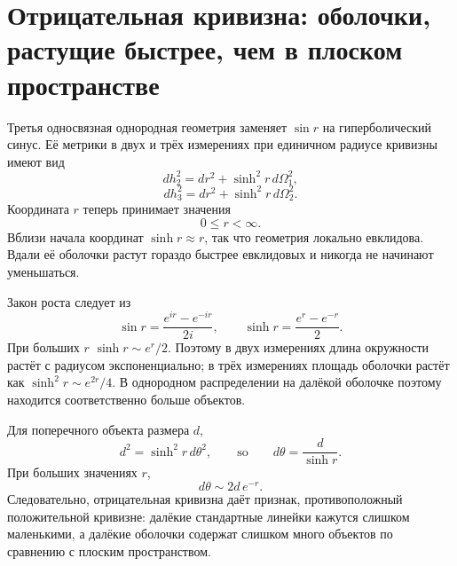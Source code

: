 \section{Отрицательная кривизна: оболочки, растущие быстрее, чем в плоском пространстве}

Третья односвязная однородная геометрия заменяет \(\sin r\) на гиперболический синус. Её метрики в двух и трёх измерениях при единичном радиусе кривизны имеют вид
\begin{equation}
dh_2^2 = dr^2 + \sinh^2 r\, d\Omega_1^2,
\label{eq:c03-hyperbolic-two}
\end{equation}
\begin{equation}
dh_3^2 = dr^2 + \sinh^2 r\, d\Omega_2^2.
\label{eq:c03-hyperbolic-three}
\end{equation}
Координата \(r\) теперь принимает значения
\begin{equation}
0\le r<\infty.
\end{equation}
Вблизи начала координат \(\sinh r\approx r\), так что геометрия локально евклидова. Вдали её оболочки растут гораздо быстрее евклидовых и никогда не начинают уменьшаться.

Закон роста следует из
\begin{equation}
\sin r = \frac{e^{ir}-e^{-ir}}{2i},
\qquad
\sinh r = \frac{e^r-e^{-r}}{2}.
\label{eq:c03-sin-sinh}
\end{equation}
При больших \(r\) \(\sinh r\sim e^r/2\). Поэтому в двух измерениях длина окружности растёт с радиусом экспоненциально; в трёх измерениях площадь оболочки растёт как \(\sinh^2r\sim e^{2r}/4\). В однородном распределении на далёкой оболочке поэтому находится соответственно больше объектов.

Для поперечного объекта размера \(d\),
\begin{equation}
d^2 = \sinh^2 r\, d\theta^2,
\qquad\text{so}\qquad
d\theta = \frac{d}{\sinh r}.
\label{eq:c03-hyperbolic-angle}
\end{equation}
При больших значениях \(r\),
\begin{equation}
d\theta \sim 2d\,e^{-r}.
\end{equation}
Следовательно, отрицательная кривизна даёт признак, противоположный положительной кривизне: далёкие стандартные линейки кажутся слишком маленькими, а далёкие оболочки содержат слишком много объектов по сравнению с плоским пространством.

\begin{classroomqa}
\end{classroomqa}

